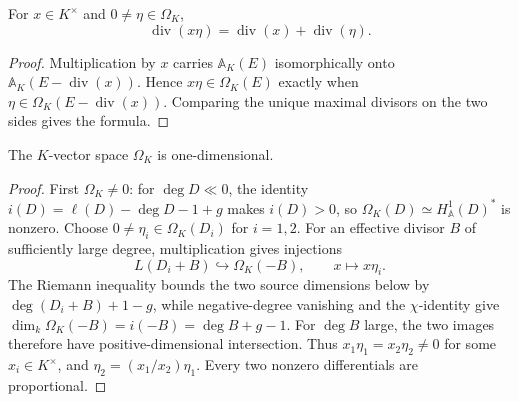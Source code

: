 \begin{theorem}
  \label{mk-thm:adelic_weil_differential_divisor_mul}
  \notready
  For \(x\in K^\times\) and \(0\ne\eta\in\Omega_K\),
  \[
    \operatorname{div}(x\eta)
      =\operatorname{div}(x)+\operatorname{div}(\eta).
  \]
\end{theorem}
\begin{proof}
  Multiplication by \(x\) carries \(\mathbb A_K(E)\) isomorphically onto
  \(\mathbb A_K(E-\operatorname{div}(x))\).  Hence
  \(x\eta\in\Omega_K(E)\) exactly when
  \(\eta\in\Omega_K(E-\operatorname{div}(x))\).  Comparing the unique
  maximal divisors on the two sides gives the formula.
\end{proof}

\begin{theorem}
  \label{mk-thm:adelic_weil_differentials_finrank_one}
  \notready
  The \(K\)-vector space \(\Omega_K\) is one-dimensional.
\end{theorem}
\begin{proof}
  First \(\Omega_K\ne0\): for \(\deg D\ll0\), the identity
  \(i(D)=\ell(D)-\deg D-1+g\) makes \(i(D)>0\), so
  \(\Omega_K(D)\simeq H^1_{\mathbb A}(D)^*\) is nonzero.  Choose
  \(0\ne\eta_i\in\Omega_K(D_i)\) for \(i=1,2\).  For an effective
  divisor \(B\) of sufficiently large degree, multiplication gives
  injections
  \[
    L(D_i+B)\hookrightarrow\Omega_K(-B),\qquad x\longmapsto x\eta_i.
  \]
  The Riemann inequality bounds the two source dimensions below by
  \(\deg(D_i+B)+1-g\), while negative-degree vanishing and the
  \(\chi\)-identity give
  \(\dim_k\Omega_K(-B)=i(-B)=\deg B+g-1\).  For \(\deg B\) large, the
  two images therefore have positive-dimensional intersection.  Thus
  \(x_1\eta_1=x_2\eta_2\ne0\) for some \(x_i\in K^\times\), and
  \(\eta_2=(x_1/x_2)\eta_1\).  Every two nonzero differentials are
  proportional.
\end{proof}

